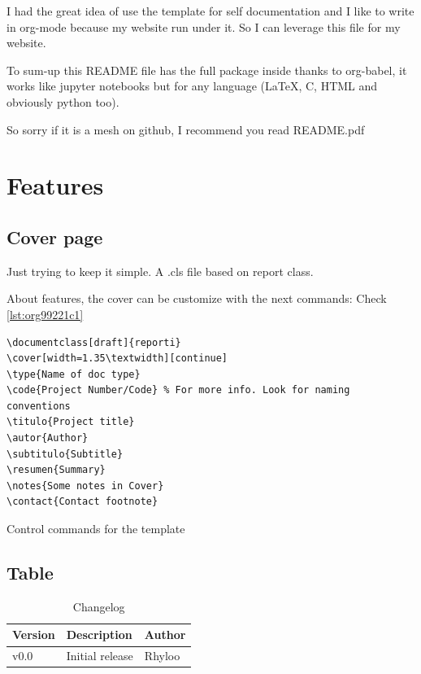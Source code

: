 \documentclass{reporti}
\begin{document}
\begin{tcolorbox}[colback=yellow!5!white,colframe=red,title=Warning, fonttitle=\Large\bfseries,
  fontupper=\noindent,boxsep=2pt,enhanced,left=10pt,top=5pt, bottom=5pt,right=10pt]
  
I had the great idea of use the template for self documentation and I like to write in org-mode because my website run under it. So I can leverage this file for my website.

To sum‐up this README file has the full package inside thanks to org-babel, it works like jupyter notebooks but for any language (LaTeX, C, HTML and obviously python too).

So sorry if it is a mesh on github, I recommend you read README.pdf
\end{tcolorbox}

\section{Features}
\label{sec:org4912e33}
\subsection{Cover page}
\label{sec:org870aedb}
Just trying to keep it simple. A .cls file based on report class.

About features, the cover can be customize with the next commands: Check \ref{lst:org99221c1}
\begin{listing}[htbp]
\begin{verbatim}
\documentclass[draft]{reporti}
\cover[width=1.35\textwidth][continue]
\type{Name of doc type}
\code{Project Number/Code} % For more info. Look for naming conventions
\titulo{Project title} 
\autor{Author}
\subtitulo{Subtitle}
\resumen{Summary}
\notes{Some notes in Cover}
\contact{Contact footnote}
\end{verbatim}
\caption{\label{lst:org99221c1}Control commands for the template}
\end{listing}

\subsection{Table}
\label{sec:orgc32cd2c}
\begin{table}[htbp]
\caption{Changelog}
\centering
\begin{tabular}{lll}
\hline
Version & Description & Author\\[0pt]
\hline
v0.0 & Initial release & Rhyloo\\[0pt]
\hline
\end{tabular}
\end{table}
\end{document}
